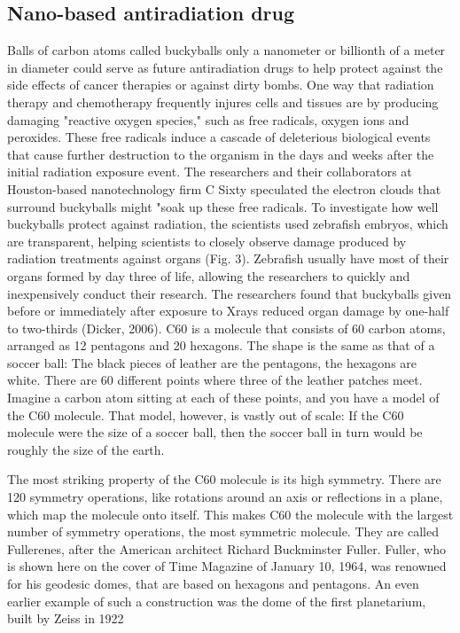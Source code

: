 \documentclass{article}
\begin{document}
\begin{multicols}
\section{Nano-based antiradiation drug}
Balls of carbon atoms called buckyballs only a nanometer or billionth of a meter in diameter could serve as future antiradiation drugs to help protect against the side effects
of cancer therapies or against dirty bombs. One way that radiation therapy and chemotherapy frequently injures cells and tissues are by producing damaging "reactive oxygen species," such as free radicals, oxygen ions and peroxides. These free radicals induce a cascade of deleterious biological events that cause further destruction to the organism in the days and    weeks after the initial radiation exposure event. The researchers and their collaborators at Houston-based nanotechnology firm C Sixty speculated the electron clouds that surround buckyballs might "soak up these free radicals. To investigate how well buckyballs protect against radiation, the scientists used zebrafish embryos, which are transparent, 
helping scientists to closely observe damage produced by radiation treatments against organs (Fig. 3). Zebrafish usually have most of their organs formed by day three of life, allowing the researchers to quickly and inexpensively conduct their research. The researchers found that buckyballs given before or immediately after exposure to Xrays reduced organ damage by one-half to two-thirds (Dicker, 2006).
C60 is a molecule that consists of 60 carbon atoms, arranged as 12 pentagons and 20 hexagons. The shape is the same as that of a soccer ball: The black pieces of leather are the pentagons, the hexagons are white. There are 60 different points where three of the leather patches meet. Imagine a carbon atom sitting at each of these points, and you  
have a model of the C60 molecule. That model, however, is vastly out of scale: If the C60 molecule were the size of a soccer ball, then the soccer ball in turn would be roughly the size of the earth.

The most striking property of the C60 molecule is its high symmetry. There are 120 symmetry operations, like rotations around an axis or reflections in a plane, which map the molecule onto itself. This makes C60 the molecule with the largest number of symmetry operations, the most symmetric molecule. They are called Fullerenes, after the American architect Richard Buckminster Fuller. Fuller, who is shown here on the cover of Time Magazine of January 10, 1964, was renowned for his geodesic domes, that are based on hexagons and pentagons. An even earlier example of such a construction was the dome of the first planetarium, built by Zeiss in 1922


\end{multicols}
\end{document}
